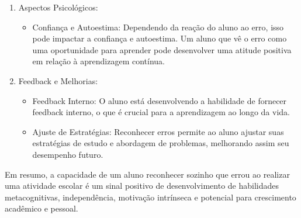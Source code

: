 \begin{enumerate}
    \item Aspectos Psicológicos:

          \begin{itemize}
              \item Confiança e Autoestima: Dependendo da reação do aluno ao erro, isso pode impactar a confiança e autoestima. Um aluno que vê o erro como uma oportunidade para aprender pode desenvolver uma atitude positiva em relação à aprendizagem contínua.
          \end{itemize}

    \item Feedback e Melhorias:

          \begin{itemize}
              \item Feedback Interno: O aluno está desenvolvendo a habilidade de fornecer feedback interno, o que é crucial para a aprendizagem ao longo da vida.
              \item Ajuste de Estratégias: Reconhecer erros permite ao aluno ajustar suas estratégias de estudo e abordagem de problemas, melhorando assim seu desempenho futuro.
          \end{itemize}

\end{enumerate}

Em resumo, a capacidade de um aluno reconhecer sozinho que errou ao realizar uma atividade escolar é um sinal positivo de desenvolvimento de habilidades metacognitivas, independência, motivação intrínseca e potencial para crescimento acadêmico e pessoal.

